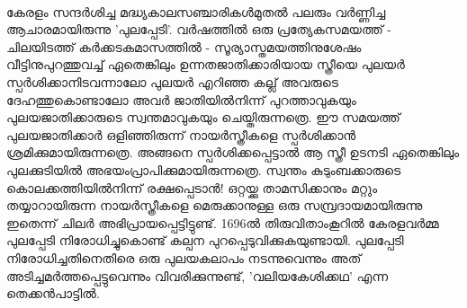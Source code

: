 \label{ch2box6} %
\begin{tcolorbox}[%
  breakable, %
  arc=0mm, 
  left=1pt, right = 1pt, 
  boxrule=0mm,
  colback = {blue!10}, %
] 

\paragraph{}

കേരളം സന്ദർശിച്ച മദ്ധ്യകാലസഞ്ചാരികൾമുതൽ പലരും വർണ്ണിച്ച ആചാരമായിരുന്നു 'പുലപ്പേടി'. വർഷത്തിൽ ഒരു പ്രത്യേകസമയത്ത് - ചിലയിടത്ത് കർക്കടകമാസത്തിൽ - സൂര്യാസ്തമയത്തിനുശേഷം വീട്ടിനുപുറത്തുവച്ച് ഏതെങ്കിലും ഉന്നതജാതിക്കാരിയായ സ്ത്രീയെ പുലയർ സ്പർശിക്കാനിടവന്നാലോ പുലയർ എറിഞ്ഞ കല്ല് അവരുടെ ദേഹത്തുകൊണ്ടാലോ അവർ ജാതിയിൽനിന്ന് പുറത്താവുകയും പുലയജാതിക്കാരുടെ സ്വന്തമാവുകയും ചെയ്തിരുന്നത്രെ. ഈ സമയത്ത് പുലയജാതിക്കാർ ഒളിഞ്ഞിരുന്ന് നായർസ്ത്രീകളെ സ്പർശിക്കാൻ ശ്രമിക്കുമായിരുന്നത്രെ. അങ്ങനെ സ്പർശിക്കപ്പെട്ടാൽ ആ സ്ത്രീ ഉടനടി ഏതെങ്കിലും പുലക്കുടിയിൽ അഭയംപ്രാപിക്കുമായിരുന്നത്രെ. സ്വന്തം കുടുംബക്കാരുടെ കൊലക്കത്തിയിൽനിന്ന് രക്ഷപ്പെടാൻ! ഒറ്റയ്ക്കു താമസിക്കാനും മറ്റും തയ്യാറായിരുന്ന നായർസ്ത്രീകളെ മെരുക്കാനുള്ള ഒരു സമ്പ്രദായമായിരുന്നു ഇതെന്ന് ചിലർ അഭിപ്രായപ്പെട്ടിട്ടുണ്ട്. 1696ൽ തിരുവിതാംകൂറിൽ കേരളവർമ്മ പുലപ്പേടി നിരോധിച്ചുകൊണ്ട് കല്പന പുറപ്പെടുവിക്കുകയുണ്ടായി. പുലപ്പേടി നിരോധിച്ചതിനെതിരെ ഒരു പുലയകലാപം നടന്നുവെന്നും അത് അടിച്ചമർത്തപ്പെട്ടുവെന്നും വിവരിക്കുന്നുണ്ട്, 'വലിയകേശിക്കഥ' എന്ന തെക്കൻപാട്ടിൽ.
\end{tcolorbox}

